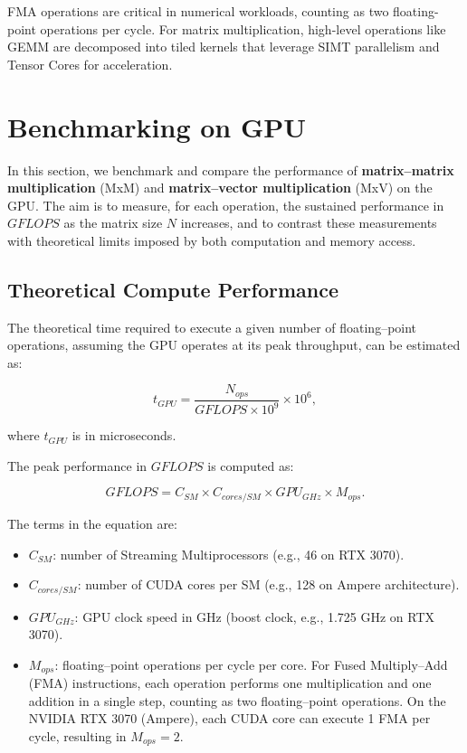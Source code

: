 FMA operations are critical in numerical workloads, counting as two floating-point operations per cycle. For matrix multiplication, high-level operations like GEMM are decomposed into tiled kernels that leverage SIMT parallelism and Tensor Cores for acceleration.

\clearpage

\section{Benchmarking on GPU}

In this section, we benchmark and compare the performance of \textbf{matrix–matrix multiplication} (MxM) and \textbf{matrix–vector multiplication} (MxV) on the GPU. The aim is to measure, for each operation, the sustained performance in $GFLOPS$ as the matrix size $N$ increases, and to contrast these measurements with theoretical limits imposed by both computation and memory access.

\vspace{0.5em}

\subsection*{Theoretical Compute Performance}

The theoretical time required to execute a given number of floating–point operations, assuming the GPU operates at its peak throughput, can be estimated as:

\begin{equation}
t_{GPU} = \frac{N_{ops}}{GFLOPS \times 10^9} \times 10^6,
\end{equation}

where $t_{GPU}$ is in microseconds.

The peak performance in $GFLOPS$ is computed as:

\begin{equation}
GFLOPS = C_{SM} \times C_{cores/SM} \times GPU_{GHz} \times M_{ops}.
\end{equation}

\noindent The terms in the equation are:
\begin{itemize}
    \item $C_{SM}$: number of Streaming Multiprocessors (e.g., 46 on RTX 3070).
    \item $C_{cores/SM}$: number of CUDA cores per SM (e.g., 128 on Ampere architecture).
    \item $GPU_{GHz}$: GPU clock speed in GHz (boost clock, e.g., 1.725 GHz on RTX 3070).
    \item $M_{ops}$: floating–point operations per cycle per core. For Fused Multiply–Add (FMA) instructions, each operation performs one multiplication and one addition in a single step, counting as two floating–point operations. On the NVIDIA RTX 3070 (Ampere), each CUDA core can execute 1 FMA per cycle, resulting in $M_{ops} = 2$.
\end{itemize}

